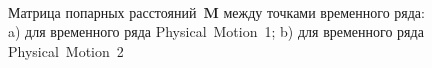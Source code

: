 \documentclass[12pt, twoside]{article}
\numberwithin{equation}{section}
\begin{document}
\begin{figure}[h!t]\center
{}
\\
\caption{Матрица попарных расстояний~$\textbf{M}$ между точками временного ряда: a) для временного ряда Physical~Motion~1; b) для временного ряда Physical~Motion~2}
\label{fig_real_distance}
\end{figure}
\end{document}

